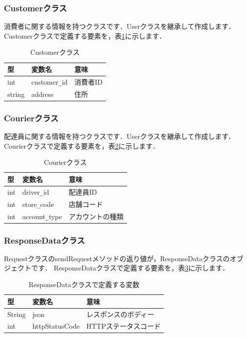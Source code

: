 \documentclass[a4j,titlepage]{jarticle}
\begin{document}
\subsubsection{Customerクラス}
消費者に関する情報を持つクラスです．Userクラスを継承して作成します．
Customerクラスで定義する要素を，表\ref{customerTable}に示します．\\
\begin{table}[htb]
\centering
\caption{Customerクラス}
\label{customerTable}
\begin{tabular}{|lll|}
\hline
型 & 変数名 & 意味      \\ \hline
int & customer\verb|_|id & 消費者ID     \\
string & address & 住所     \\\hline
\end{tabular}
\end{table}

\subsubsection{Courierクラス}
配達員に関する情報を持つクラスです．Userクラスを継承して作成します．
Courierクラスで定義する要素を，表\ref{courierTable}に示します．\\
\begin{table}[htb]
\centering
\caption{Courierクラス}
\label{courierTable}
\begin{tabular}{|lll|}
\hline
型 & 変数名 & 意味      \\ \hline
int & driver\verb|_|id & 配達員ID     \\
int & store\verb|_|code & 店舗コード     \\
int & account\verb|_|type & アカウントの種類 \\ \hline
\end{tabular}
\end{table}

\subsubsection{ResponseDataクラス}
RequestクラスのsendRequestメソッドの返り値が，ResponseDataクラスのオブジェクトです．
ResponseDataクラスで定義する要素を，表\ref{responseTable}に示します．\\
\begin{table}[htb]
\centering
\caption{ResponseDataクラスで定義する変数}
\label{responseTable}
\begin{tabular}{|lll|}
\hline
型 & 変数名 & 意味      \\ \hline
String & json & レスポンスのボディー\\
int &  httpStatusCode & HTTPステータスコード\\\hline
\end{tabular}
\end{table}
\end{document}
